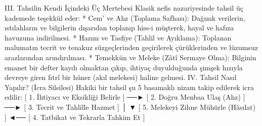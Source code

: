 \documentclass[11pt,a4paper]{article}
\begin{document}
III. Tahsilin Kendi İçindeki Üç Mertebesi
Klasik nefis nazariyesinde tahsil üç kademede teşekkül eder:
 * Cem' ve Ahz (Toplama Safhası): Dağınık verilerin, ıstılahların ve bilgilerin dışarıdan toplanıp hiss-i müşterek, hayal ve hafıza havuzuna indirilmesi.
 * Hazım ve Tasfiye (Tahlil ve Ayıklama): Toplanan malumatın tecrit ve tenakuz süzgeçlerinden geçirilerek çürüklerinden ve lüzumsuz arazlarından arındırılması.
 * Temekkün ve Meleke (Zâtî Sermaye Olma): Bilginin emanet bir defter kaydı olmaktan çıkıp, ihtiyaç duyulduğunda şimşek hızıyla devreye giren fıtrî bir hüner (akıl melekesi) haline gelmesi.
IV. Tahsil Nasıl Yapılır? (İcra Silsilesi)
Hakiki bir tahsil şu 5 basamaklı nizam takip edilerek icra edilir:
[ 1. İhtiyacı ve Eksikliği Belirle ] ──► [ 2. Doğru Menbaa Ulaş (Ahz) ] ──► [ 3. Tecrit ve Tahlille Hazmet ]
                                                                                   │
                                                                                   ▼
[ 5. Melekeyi Zihne Mühürle (Hâsılat) ] ◄── [ 4. Tatbikat ve Tekrarla Tahkim Et ]
\end{document}
